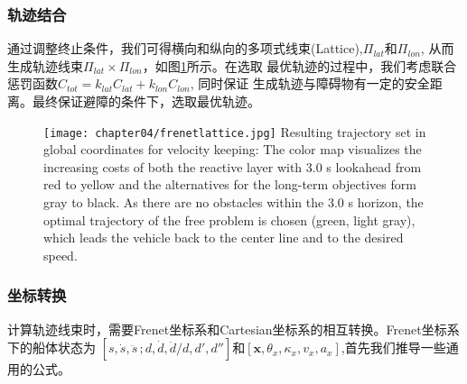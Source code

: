 \subsubsection{轨迹结合}
通过调整终止条件，我们可得横向和纵向的多项式线束(Lattice),$\Pi_{lat}$和$\Pi_{lon}$,
从而生成轨迹线束$\Pi_{lat} \times \Pi_{lon}$，如图\ref{fig:frenetlattice}所示。在选取
最优轨迹的过程中，我们考虑联合惩罚函数$C_{tot}=k_{lat}C_{lat}+k_{lon}C_{lon}$, 同时保证
生成轨迹与障碍物有一定的安全距离。最终保证避障的条件下，选取最优轨迹。

\begin{figure}[!htp]
  \centering
  \texttt{[image: chapter04/frenetlattice.jpg]}
    {Resulting trajectory set in global coordinates for velocity keeping: The color map visualizes the increasing costs of both the reactive layer with 3.0 s lookahead from red to yellow and the alternatives for the long-term objectives form gray to black. As there are no obstacles within the 3.0 s horizon, the optimal trajectory of the free problem is chosen (green, light gray), which leads the vehicle back to the center line and to the desired speed.
    }
  \label{fig:frenetlattice}
\end{figure}


\subsubsection{坐标转换}
计算轨迹线束时，需要Frenet坐标系和Cartesian坐标系的相互转换。Frenet坐标系下的船体状态为
$ [s, \dot{s}, \ddot{s} \,; d, \dot{d},\ddot{d}/d, d', d'']$和$[\bm{x}, \theta_x, \kappa_x, v_x, a_x]$,首先我们推导一些通用的公式。

